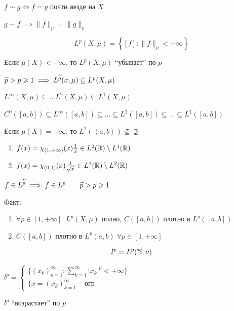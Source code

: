 $f\sim g \iff f = g$ почти везде на $X$

$g\sim f \implies \|f\|_p = \|g\|_p$

\begin{definition}
    \[L^p(X, \mu) = \left\{ [f]: \|f\|_p <+\infty  \right\} \]

\end{definition}

\begin{statement}
    Если $\mu(X) <+\infty $, то $L^p(X, \mu)$ ``убывает'' по $p$

    $\widetilde{p} > p \geqslant 1 \implies L^{\widetilde{p}}(x, \mu) \subseteq L^p(X, \mu)$

    $L^{\infty }(X, \mu) \subseteq \ldots L^2(X, \mu) \subseteq L^1(X, \mu)$

    $C^0([a,b]) \subseteq L^{\infty }([a,b]) \subseteq \ldots \subseteq L^2([a,b]) \subseteq \ldots \subseteq L^1([a,b])$
\end{statement}

Если $\mu(X) = +\infty $, то $L^2(\left<a,b \right>) \nsubseteq\nsupseteq$

\begin{enumerate}
    \item $f(x) = \chi_{(1, +\infty )}(x) \frac{1}{x} \in L^2(\mathbb{R})\setminus L^1(\mathbb{R})$
    \item $f(x) = \chi_{(0,1)}(x) \frac{1}{\sqrt{x} }\in L^1(\mathbb{R}) \setminus L^2(\mathbb{R})$
\end{enumerate}

\begin{statement}
    $f\in L^{\widetilde{p}} \implies f\in L^p\qquad \widetilde{p} > p \geqslant 1$
\end{statement} %

\begin{note}
    Факт:
    \begin{enumerate}
        \item $\forall p\in [1, +\infty]\;\;L^p(X, \mu)$ полно, $C([a,b])$ плотно в $L^p([a,b])$
        \item $C([a,b])$ плотно в $L^p({a,b}) \;\forall p\in [1,+\infty ]$
    \end{enumerate}
\end{note}

\begin{definition}
    \[l^p = L^p(\mathbb{N} , \nu)\]

    $l^p = \begin{cases}
        \{(x_k)_{k=1}^{\infty }: \sum_{k=1}^{\infty } |x_k|^p <+\infty \}\\
        \{x = (x_k)_{k=1}^\infty \text{ -- огр}
    \end{cases}$

    $l^p$ ``возрастает'' по $p$
\end{definition}


